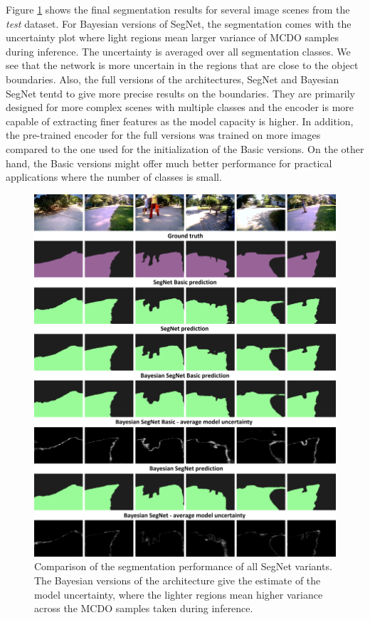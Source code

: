 Figure \ref{comparison} shows the final segmentation results for several image scenes from the \textit{test} dataset. For Bayesian versions of SegNet, the segmentation comes with the uncertainty plot where light regions mean larger variance of MCDO samples during inference. The uncertainty is averaged over all segmentation classes. We see that the network is more uncertain in the regions that are close to the object boundaries. Also, the full versions of the architectures, SegNet and Bayesian SegNet tentd to give more precise results on the boundaries. They are primarily designed for more complex scenes with multiple classes and the encoder is more capable of extracting finer features as the model capacity is higher. In addition, the pre-trained encoder for the full versions was trained on more images compared to the one used for the initialization of the Basic versions. On the other hand, the Basic versions might offer much better performance for practical applications where the number of classes is small.

\begin{figure}[h]
	\begin{center}
		\includegraphics*[width=16cm, keepaspectratio]{obr/result.png}
	\end{center}
	\vspace{5mm}
	\caption{Comparison of the segmentation performance of all SegNet variants. The Bayesian versions of the architecture give the estimate of the model uncertainty, where the lighter regions mean higher variance across the MCDO samples taken during inference.} 
	\label{comparison}
\end{figure}
